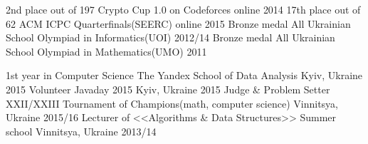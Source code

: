 






\begin{cvhonors}
  \cvhonor
    {2nd place out of 197}
    {Crypto Cup 1.0 on Codeforces}
    {online}
    {2014}
  \cvhonor
    {17th place out of 62}
    {ACM ICPC Quarterfinals(SEERC)}
    {online}
    {2015}
  \cvhonor
    {Bronze medal}
    {All Ukrainian School Olympiad in Informatics(UOI)}
    {}
    {2012/14}
  \cvhonor
    {Bronze medal}
    {All Ukrainian School Olympiad in Mathematics(UMO)}
    {}
    {2011}
\end{cvhonors}

\begin{cvhonors}
  \cvhonor
    {1st year in Computer Science}
    {The Yandex School of Data Analysis}
    {Kyiv, Ukraine}
    {2015}
  \cvhonor
    {Volunteer}
    {Javaday 2015}
    {Kyiv, Ukraine}
    {2015}
  \cvhonor
    {Judge \& Problem Setter}
    {XXII/XXIII Tournament of Champions(math, computer science)}
    {Vinnitsya, Ukraine}
    {2015/16}
  \cvhonor
    {Lecturer of <<Algorithms \& Data Structures>>}
    {Summer school}
    {Vinnitsya, Ukraine}
    {2013/14}
\end{cvhonors}
